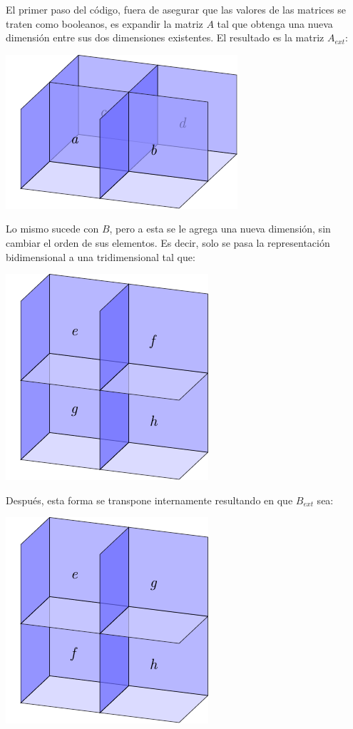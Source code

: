 \documentclass{article}
\begin{document}
El primer paso del código, fuera de asegurar que las valores de las matrices se traten como booleanos, es expandir la matriz $A$ tal que obtenga una nueva dimensión entre sus dos dimensiones existentes. El resultado es la matriz $A_{ext}$:

\begin{center}
    \includegraphics{1.pdf}
\end{center}

Lo mismo sucede con $B$, pero a esta se le agrega una nueva dimensión, sin cambiar el orden de sus elementos. Es decir, solo se pasa la representación bidimensional a una tridimensional tal que:

\begin{center}
    \includegraphics{2.pdf}
\end{center}

Después, esta forma se transpone internamente resultando en que $B_{ext}$ sea:

\begin{center}
    \includegraphics{3.pdf}
\end{center}
\end{document}
